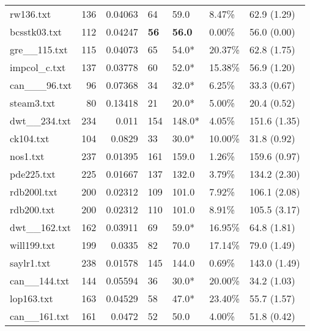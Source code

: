 \begin{table}[h]
\begin{tabular}{lrrllll}
 rw136.txt          &     136 &     0.04063 & 64           & 59.0            & 8.47\%   & 62.9 (1.29)    \\
 bcsstk03.txt       &     112 &     0.04247 & \textbf{56}  & \textbf{56.0}   & 0.00\%   & 56.0 (0.00)    \\
 gre__115.txt       &     115 &     0.04073 & 65           & 54.0*           & 20.37\%  & 62.8 (1.75)    \\
 impcol_c.txt       &     137 &     0.03778 & 60           & 52.0*           & 15.38\%  & 56.9 (1.20)    \\
 can___96.txt       &      96 &     0.07368 & 34           & 32.0*           & 6.25\%   & 33.3 (0.67)    \\
 steam3.txt         &      80 &     0.13418 & 21           & 20.0*           & 5.00\%   & 20.4 (0.52)    \\
 dwt__234.txt       &     234 &     0.011   & 154          & 148.0*          & 4.05\%   & 151.6 (1.35)   \\
 ck104.txt          &     104 &     0.0829  & 33           & 30.0*           & 10.00\%  & 31.8 (0.92)    \\
 nos1.txt           &     237 &     0.01395 & 161          & 159.0           & 1.26\%   & 159.6 (0.97)   \\
 pde225.txt         &     225 &     0.01667 & 137          & 132.0           & 3.79\%   & 134.2 (2.30)   \\
 rdb200l.txt        &     200 &     0.02312 & 109          & 101.0           & 7.92\%   & 106.1 (2.08)   \\
 rdb200.txt         &     200 &     0.02312 & 110          & 101.0           & 8.91\%   & 105.5 (3.17)   \\
 dwt__162.txt       &     162 &     0.03911 & 69           & 59.0*           & 16.95\%  & 64.8 (1.81)    \\
 will199.txt        &     199 &     0.0335  & 82           & 70.0            & 17.14\%  & 79.0 (1.49)    \\
 saylr1.txt         &     238 &     0.01578 & 145          & 144.0           & 0.69\%   & 143.0 (1.49)   \\
 can__144.txt       &     144 &     0.05594 & 36           & 30.0*           & 20.00\%  & 34.2 (1.03)    \\
 lop163.txt         &     163 &     0.04529 & 58           & 47.0*           & 23.40\%  & 55.7 (1.57)    \\
 can__161.txt       &     161 &     0.0472  & 52           & 50.0            & 4.00\%   & 51.8 (0.42)    \\

\end{tabular}
\end{table}
